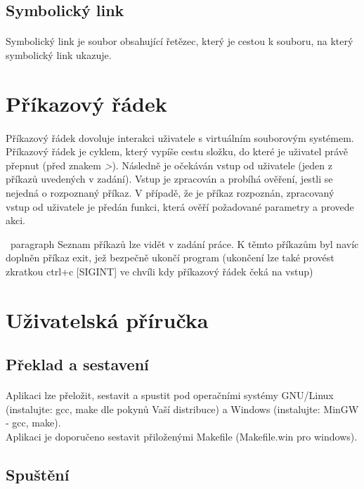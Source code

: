 \documentclass[12pt, a4paper]{article}
\begin{document}
\subsection{Symbolický link}
\paragraph{}
Symbolický link je soubor obsahující řetězec, který je cestou k souboru, na který symbolický link ukazuje. 


\newpage
\section{Příkazový řádek}
\paragraph{}
Příkazový řádek dovoluje interakci uživatele s virtuálním souborovým systémem. Příkazový řádek je cyklem, který vypíše cestu složku, do které je uživatel právě přepnut (před znakem \textit{>}). Následně je očekáván vstup od uživatele (jeden z příkazů uvedených v zadání). Vstup je zpracován a probíhá ověření, jestli se nejedná o rozpoznaný příkaz. V případě, že je příkaz rozpoznán, zpracovaný vstup od uživatele je předán funkci, která ověří požadované parametry a provede akci. 

\ paragraph{}
Seznam příkazů lze vidět v zadání práce. K těmto příkazům byl navíc doplněn příkaz exit, jež bezpečně ukončí program (ukončení lze také provést zkratkou ctrl+c [SIGINT] ve chvíli kdy příkazový řádek čeká na vstup) 

\newpage
\section{Uživatelská příručka}
\subsection{Překlad a sestavení}
\paragraph{}
Aplikaci lze přeložit, sestavit a spustit pod operačními systémy GNU/Linux (instalujte: gcc, make dle pokynů Vaší distribuce) a Windows (instalujte: MinGW - gcc, make). \\ Aplikaci je doporučeno sestavit přiloženými Makefile (Makefile.win pro windows). 

\subsection{Spuštění}
\end{document}
